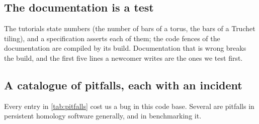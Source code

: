 \subsection{The documentation is a test}\label{sec:docs-tests}

The tutorials state numbers (the number of bars of a torus, the bars of a Truchet tiling), and a specification asserts each
of them; the code fences of the documentation are compiled by its build. Documentation that is wrong breaks the build, and the
first five lines a newcomer writes are the ones we test first.

\subsection{A catalogue of pitfalls, each with an incident}\label{sec:pitfalls}

Every entry in \cref{tab:pitfalls} cost us a bug in this code base. Several are pitfalls in persistent homology software
generally, and in benchmarking it.

